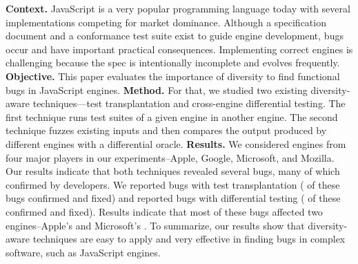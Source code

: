 \textbf{Context.} JavaScript is a very popular programming language today with several
implementations competing for market dominance. Although a
specification document and a conformance test suite exist to guide
engine development, bugs occur and have important practical
consequences. Implementing correct
engines is challenging because the spec is intentionally
incomplete and evolves frequently.
\textbf{Objective.} This paper evaluates the importance of
diversity to find functional bugs in JavaScript engines. \textbf{Method.} For that, we
studied two existing diversity-aware techniques---test transplantation and
cross-engine differential testing. The first technique runs test
suites of a given engine in another engine. The second technique
fuzzes existing inputs and then compares the output produced by
different engines with a differential oracle.
\textbf{Results.} We considered engines from four major players in our
experiments--Apple, Google, Microsoft, and Mozilla. Our results
indicate that both techniques revealed several bugs, many of which
confirmed by developers. We reported \noBugsTransplantation{} bugs
with test transplantation (\noBugsTransplantationConfirmed{} of these bugs
confirmed and \noBugsTransplantationFixed{} fixed) and reported
\noBugsDifferentialTesting{} bugs with differential testing
(\noBugsDifferentialTestingConfirmed{} of these confirmed
and \noBugsDifferentialTestingFixed{} fixed). Results indicate that
most of these bugs affected two engines--Apple's
\jsc{} and Microsoft's \chakra{}. To summarize, our results show that
diversity-aware techniques are easy to apply and very effective in
finding bugs in complex software, such as JavaScript engines.
